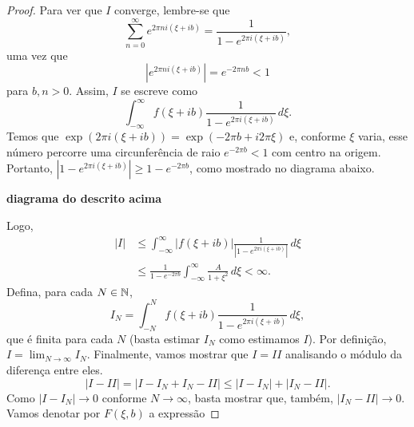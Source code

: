 \begin{proof}
        Para ver que $I$ converge, lembre-se que
        \begin{equation*}
            \sum_{n=0}^{\infty} e^{2\pi n i(\xi + ib)} = \frac{1}{1 - e^{2\pi i(\xi + ib)}},
        \end{equation*}
        uma vez que
        \begin{equation*}
            |e^{2\pi n i(\xi + ib)}| = e^{-2\pi nb} < 1
        \end{equation*}
        para $b,n > 0$. Assim, $I$ se escreve como
        \begin{equation*}
            \int_{-\infty}^{\infty} f(\xi + ib)\frac{1}{1 - e^{2\pi i(\xi + ib)}}\,d\xi.
        \end{equation*}
        Temos que $\exp(2\pi i (\xi + ib)) = \exp(-2\pi b + i2\pi \xi)$ e, 
        conforme $\xi$ varia, esse número percorre uma circunferência de raio 
        $e^{-2\pi b} < 1$ com centro na origem. Portanto, 
        $|1 - e^{2\pi i(\xi + ib)}| \geq 1 - e^{-2\pi b}$, como mostrado no 
        diagrama abaixo.
        \begin{center}
            {\bf diagrama do descrito acima}
        \end{center}
        Logo,
        \begin{align*}
            |I| &\leq \int_{-\infty}^{\infty}|f(\xi + ib)|\frac{1}{|1 - e^{2\pi i(\xi + ib)}|} \, d\xi \\
            &\leq \frac{1}{1 - e^{-2\pi b}}\int_{-\infty}^{\infty} \frac{A}{1 + \xi^2} \, d\xi < \infty.
        \end{align*}
        Defina, para cada $N\in \mathbb{N}$,
        \begin{equation*}
            I_N = \int_{-N}^{N}f(\xi + ib)\frac{1}{1 - e^{2\pi i(\xi + ib)}} \, d\xi,
        \end{equation*}
        que é finita para cada $N$ (basta estimar $I_N$ como estimamos $I$).
        Por definição, $I = \displaystyle{\lim_{N\to\infty} I_N}$. 
        Finalmente, vamos mostrar que $I = II$ 
        analisando o módulo da diferença entre eles.
        \begin{equation*}
            |I - II|  = |I - I_N + I_N - II| \leq |I-I_N| + |I_N - II|.
        \end{equation*}
        Como $|I - I_N| \to 0$ conforme $N \to \infty$, basta mostrar que, também, 
        $|I_N - II| \to 0$. Vamos denotar por $F(\xi,b)$ a expressão 

\end{proof}
